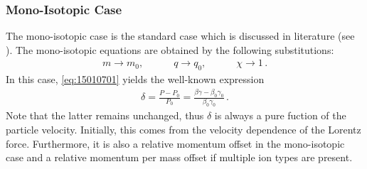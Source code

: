 
\subsubsection{Mono-Isotopic Case}
The mono-isotopic case is the standard case which is discussed in literature (see \cite{Proceedings1994zua,wiedemann1999particle,lee2012accelerator}). The mono-isotopic equations are obtained by the following substitutions:
\begin{align}
m \rightarrow m_0, \quad \quad \quad q \rightarrow q_0, \quad \quad \quad  \chi \rightarrow 1\, .
\end{align}
In this case, \eqref{eq:15010701} yields the well-known expression
\begin{align}
\delta = \frac{P - P_0}{P_0} = \frac{\beta \gamma - \beta_0 \gamma_0}{\beta_0 \gamma_0} \, .
\end{align}
Note that the latter remains unchanged, thus $\delta$ is always a pure fuction of the particle velocity. Initially, this comes from the velocity dependence of the Lorentz force. Furthermore, it is also a relative momentum offset in the mono-isotopic case and a relative momentum per mass offset if multiple ion types are present.



